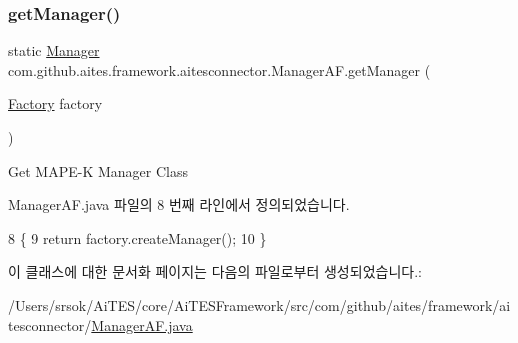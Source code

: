 \subsubsection{\texorpdfstring{get\+Manager()}{getManager()}}
{\footnotesize\ttfamily static \mbox{\hyperlink{classcom_1_1github_1_1aites_1_1framework_1_1aitesmanager_1_1_manager}{Manager}} com.\+github.\+aites.\+framework.\+aitesconnector.\+Manager\+A\+F.\+get\+Manager (\begin{DoxyParamCaption}\item[{\mbox{\hyperlink{interfacecom_1_1github_1_1aites_1_1framework_1_1aitesconnector_1_1_factory}{Factory}}}]{factory }\end{DoxyParamCaption})\hspace{0.3cm}{\ttfamily [static]}}



Get M\+A\+P\+E-\/K Manager Class 



Manager\+A\+F.\+java 파일의 8 번째 라인에서 정의되었습니다.


\begin{DoxyCode}
8                                                      \{
9         \textcolor{keywordflow}{return} factory.createManager();
10     \}
\end{DoxyCode}


이 클래스에 대한 문서화 페이지는 다음의 파일로부터 생성되었습니다.\+:\begin{DoxyCompactItemize}
\item 
/\+Users/srsok/\+Ai\+T\+E\+S/core/\+Ai\+T\+E\+S\+Framework/src/com/github/aites/framework/aitesconnector/\mbox{\hyperlink{_manager_a_f_8java}{Manager\+A\+F.\+java}}\end{DoxyCompactItemize}
